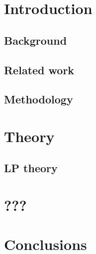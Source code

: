 \documentclass[paper=A4,DIV=calc]{scrbook}
\theoremstyle{plain}
\theoremstyle{definition}
\begin{document}
	\frontmatter
	\makefrontmatter

	\cleardoublepage
	\tableofcontents
	
	\mainmatter
	\chapter{Introduction}
	\section{Background}
	\section{Related work}
	\section{Methodology}

	\chapter{Theory}
	\section{LP theory}
	

	\chapter{???}

	\chapter{Conclusions}

	\nocite{*}
	\printbibliography[heading=bibintoc]
	\printglossary[type=\acronymtype,]
	\backmatter
\end{document}

